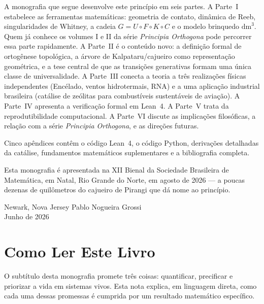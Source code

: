 \documentclass[12pt,a4paper,twoside]{book}
\theoremstyle{plain}
\theoremstyle{definition}
\theoremstyle{definition}
\newcommand{\dm}{\mathrm{dm}^{3}}
\begin{document}
A monografia que segue desenvolve este princípio em seis partes. A Parte~I
estabelece as ferramentas matemáticas: geometria de contato, dinâmica de
Reeb, singularidades de Whitney, a cadeia $G = U \circ F \circ K \circ C$
e o modelo brinquedo $\dm$. Quem já conhece os volumes I e II da série
\emph{Principia Orthogona} pode percorrer essa parte rapidamente. A Parte~II
é o conteúdo novo: a definição formal de ortogênese topológica, a árvore
de Kalpataru/cajueiro como representação geométrica, e a tese central de
que as transições generativas formam uma única classe de universalidade.
A Parte~III conecta a teoria a três realizações físicas independentes
(Encélado, ventos hidrotermais, RNA) e a uma aplicação industrial brasileira
(catálise de zeólitas para combustíveis sustentáveis de aviação).
A Parte~IV apresenta a verificação formal em Lean~4. A Parte~V trata
da reprodutibilidade computacional. A Parte~VI discute as implicações
filosóficas, a relação com a série \emph{Principia Orthogona},
e as direções futuras.

Cinco apêndices contêm o código Lean~4, o código Python, derivações
detalhadas da catálise, fundamentos matemáticos suplementares e a
bibliografia completa.

Esta monografia é apresentada na XII Bienal da Sociedade Brasileira de
Matemática, em Natal, Rio Grande do Norte, em agosto de 2026 --- a poucas
dezenas de quilômetros do cajueiro de Pirangi que dá nome ao princípio.

\vspace{0.6cm}\noindent
Newark, Nova Jersey \hfill Pablo Nogueira Grossi\\
\hspace*{1in}Junho de 2026

\chapter*{Como Ler Este Livro}

O subtítulo desta monografia promete três coisas: quantificar, precificar
e priorizar a vida em sistemas vivos. Esta nota explica, em linguagem
direta, como cada uma dessas promessas é cumprida por um resultado
matemático específico.
\end{document}
